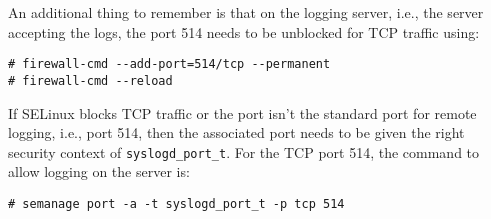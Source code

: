 An additional thing to remember is that on the logging server, i.e., the server accepting the logs, the port 514 needs to be unblocked for TCP traffic using:

\vspace{-15pt}
\begin{verbatim}
# firewall-cmd --add-port=514/tcp --permanent
# firewall-cmd --reload
\end{verbatim}
\vspace{-10pt}	

\noindent
If SELinux blocks TCP traffic or the port isn't the standard port for remote logging, i.e., port 514, then the associated port needs to be given the right security context of \verb|syslogd_port_t|. For the TCP port 514, the command to allow logging on the server is:

\vspace{-15pt}
\begin{verbatim}
# semanage port -a -t syslogd_port_t -p tcp 514
\end{verbatim}